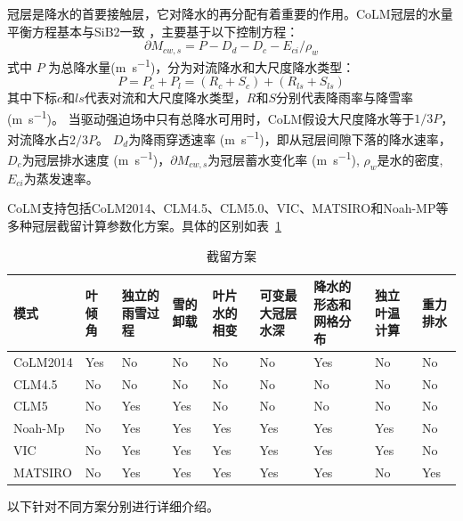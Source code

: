 冠层是降水的首要接触层，它对降水的再分配有着重要的作用。CoLM冠层的水量平衡方程基本与SiB2一致 \citep{sellers1996revised}，主要基于以下控制方程：
\begin{equation}\label{冠层水量控制方程}
\partial M_{cw,s}=P-D_{d}-D_{c}-E_{ci} / \rho_{w}
\end{equation}
式中 $P$ 为总降水量(\unit{m.s^{-1}})，分为对流降水和大尺度降水类型：
\begin{equation}
P=P_{c}+P_{l}=\left(R_{c}+S_{c}\right)+\left(R_{ls}+S_{ls}\right)
\end{equation}
其中下标$c$和$ls$代表对流和大尺度降水类型，$R$和$S$分别代表降雨率与降雪率 (\unit{m.s^{-1}})。
当驱动强迫场中只有总降水可用时，CoLM假设大尺度降水等于$1/3P$，对流降水占$2/3P$。
$D_d$为降雨穿透速率 (\unit{m.s^{-1}})，即从冠层间隙下落的降水速率，$D_c$为冠层排水速度 (\unit{m.s^{-1}})，$\partial M_{cw,s}$为冠层蓄水变化率 (\unit{m.s^{-1}}), 
$\rho_w$是水的密度, $E_{ci}$为蒸发速率。


CoLM支持包括CoLM2014、CLM4.5、CLM5.0、VIC、MATSIRO和Noah-MP等多种冠层截留计算参数化方案。具体的区别如表~\ref{tab:截留方案特色}
\begin{table}[htbp]
\caption{截留方案}
\label{tab:截留方案特色}
\begin{tabular}[h]{p{2cm}p{1.5cm}p{1.5cm}p{1.5cm}p{1.5cm}p{1.5cm}p{1.5cm}p{1.5cm}p{1.5cm}}
\toprule
模式       & 叶倾角 & 独立的雨雪过程 & 雪的卸载 & 叶片水的相变 & 可变最大冠层水深 & 降水的形态和网格分布& 独立叶温计算 & 重力排水\\\midrule
CoLM2014 & Yes & No      & No   & No     & No       & Yes        & No     & No   \\
CLM4.5   & No  & No      & No   & No     & No       & No         & No     & No   \\
CLM5     & No  & Yes     & Yes  & No     & No       & No         & No     & No   \\
Noah-Mp  & No  & Yes     & Yes  & Yes    & Yes      & Yes        & Yes    & No   \\
VIC      & No  & Yes     & Yes  & Yes    & Yes      & Yes        & Yes    & No   \\
MATSIRO  & No  & Yes     & Yes  & Yes    & Yes      & Yes        & No     & Yes \\    \bottomrule

\end{tabular}
\end{table}

以下针对不同方案分别进行详细介绍。

